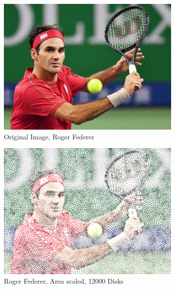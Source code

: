 \documentclass[11pt]{article}
\begin{document}
\begin{figure}[H]
	\centering
	\begin{subfigure}[b]{.52\linewidth}
		\includegraphics[width=\linewidth]{Roger-Federer}
		\caption{Original Image, Roger Federer}
		\label{fig:rf}
	\end{subfigure}
	\begin{subfigure}[b]{.48\linewidth}
		\includegraphics[width=\linewidth]{Roger-Federer-AreaScale-12000}
		\caption{Roger Federer, Area scaled, 12000 Disks}
		\label{fig:rf2}
	\end{subfigure}
	\begin{subfigure}[b]{.48\linewidth}

\end{subfigure}
\end{figure}
\end{document}
